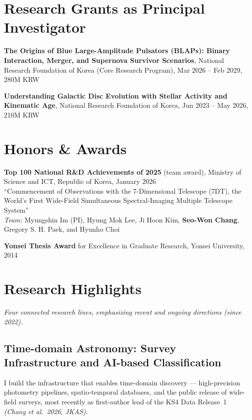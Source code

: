 \documentclass[letterpaper,11pt]{article}
\renewenvironment{itemize}{
  \begin{list}{}{
    \setlength{\leftmargin}{1.5em}
    \setlength{\itemsep}{0.2em}
    \setlength{\parsep}{0em}
  }
}{
  \end{list}
}
\begin{document}
\section*{Research Grants as Principal Investigator}
\begin{itemize}
\item \textbf{The Origins of Blue Large-Amplitude Pulsators (BLAPs): Binary Interaction,
      Merger, and Supernova Survivor Scenarios}, National Research Foundation of Korea
      (Core Research Program), Mar 2026 -- Feb 2029, 280M KRW 
\item \textbf{Understanding Galactic Disc Evolution with Stellar Activity and Kinematic
      Age}, National Research Foundation of Korea, Jun 2023 -- May 2026, 210M KRW 
\end{itemize}

\section*{Honors \& Awards}
\begin{itemize}
\item \textbf{Top 100 National R\&D Achievements of 2025} (team award),
      Ministry of Science and ICT, Republic of Korea, January 2026 \\
      ``Commencement of Observations with the 7-Dimensional Telescope (7DT),
      the World's First Wide-Field Simultaneous Spectral-Imaging Multiple
      Telescope System'' \\
      \textit{Team:} Myungshin Im (PI), Hyung Mok Lee, Ji Hoon Kim,
      \textbf{Seo-Won Chang}, Gregory S. H. Paek, and Hyunho Choi
\item \textbf{Yonsei Thesis Award} for Excellence in Graduate Research,
      Yonsei University, 2014
\end{itemize}

\section*{Research Highlights}
\emph{Four connected research lines, emphasizing recent and ongoing directions (since 2022).}

\subsection*{Time-domain Astronomy: Survey Infrastructure and AI-based Classification}
I build the infrastructure that enables time-domain discovery --- high-precision photometry
pipelines, spatio-temporal databases, and the public release of wide-field surveys, most
recently as first-author lead of the KS4 Data Release~1 \emph{(Chang et al.\ 2026, JKAS)}.
\end{document}
